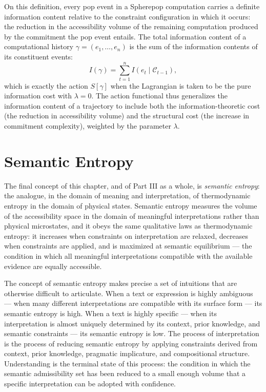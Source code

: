 \documentclass[12pt,openany]{book}
\theoremstyle{plain}
\theoremstyle{definition}
\theoremstyle{remark}
\begin{document}
On this definition, every pop event in a Spherepop computation carries a definite information content relative to the constraint configuration in which it occurs: the reduction in the accessibility volume of the remaining computation produced by the commitment the pop event entails. The total information content of a computational history $\gamma = (e_1, \ldots, e_n)$ is the sum of the information contents of its constituent events:
\[
  I(\gamma) = \sum_{t=1}^{n} I(e_t \mid \mathcal{C}_{t-1}),
\]
which is exactly the action $S[\gamma]$ when the Lagrangian is taken to be the pure information cost with $\lambda = 0$. The action functional thus generalizes the information content of a trajectory to include both the information-theoretic cost (the reduction in accessibility volume) and the structural cost (the increase in commitment complexity), weighted by the parameter $\lambda$.

\section{Semantic Entropy}

The final concept of this chapter, and of Part III as a whole, is \emph{semantic entropy}: the analogue, in the domain of meaning and interpretation, of thermodynamic entropy in the domain of physical states. Semantic entropy measures the volume of the accessibility space in the domain of meaningful interpretations rather than physical microstates, and it obeys the same qualitative laws as thermodynamic entropy: it increases when constraints on interpretation are relaxed, decreases when constraints are applied, and is maximized at semantic equilibrium — the condition in which all meaningful interpretations compatible with the available evidence are equally accessible.

The concept of semantic entropy makes precise a set of intuitions that are otherwise difficult to articulate. When a text or expression is highly ambiguous — when many different interpretations are compatible with its surface form — its semantic entropy is high. When a text is highly specific — when its interpretation is almost uniquely determined by its context, prior knowledge, and semantic constraints — its semantic entropy is low. The process of interpretation is the process of reducing semantic entropy by applying constraints derived from context, prior knowledge, pragmatic implicature, and compositional structure. Understanding is the terminal state of this process: the condition in which the semantic admissibility set has been reduced to a small enough volume that a specific interpretation can be adopted with confidence.
\end{document}
